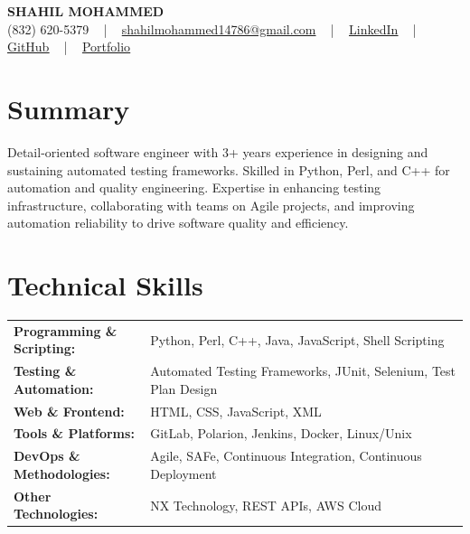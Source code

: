 \documentclass[letterpaper,11pt]{article}
\begin{document}
\begin{center}
    {\fontsize{14pt}{12pt}\selectfont \textbf{\MakeUppercase{Shahil Mohammed}}}\\ \vspace{2pt}
    \fontsize{10pt}{12pt}\selectfont (832) 620-5379 ~ | ~ \href{mailto:shahilmohammed14786@gmail.com}{shahilmohammed14786@gmail.com} ~ | ~  
    \href{https://www.linkedin.com/in/shahil-mohammed-9652931a1/}{\color{blue}\underline{LinkedIn}}  ~ | ~ 
    \href{https://github.com/freakbeast14}{\color{blue}\underline{GitHub}} ~ | ~ 
    \href{https://shahil-mohammed.netlify.app/}{\color{blue}\underline{Portfolio}}
    \vspace{-8pt}
\end{center}

\section{Summary}
\fontsize{9pt}{10pt}\selectfont
Detail-oriented software engineer with 3+ years experience in designing and sustaining automated testing frameworks. Skilled in Python, Perl, and C++ for automation and quality engineering. Expertise in enhancing testing infrastructure, collaborating with teams on Agile projects, and improving automation reliability to drive software quality and efficiency.
 \vspace{-5pt}
 
\section{Technical Skills}
        \vspace{-14pt}
        \begin{table}[h]
            \fontsize{9pt}{10pt}\selectfont
            \begin{tabular}{p{0.3\linewidth} p{0.7\linewidth}}
                \textbf{Programming \& Scripting:} & Python, Perl, C++, Java, JavaScript, Shell Scripting \\
                \textbf{Testing \& Automation:} & Automated Testing Frameworks, JUnit, Selenium, Test Plan Design \\
                \textbf{Web \& Frontend:} & HTML, CSS, JavaScript, XML \\
                \textbf{Tools \& Platforms:} & GitLab, Polarion, Jenkins, Docker, Linux/Unix \\
                \textbf{DevOps \& Methodologies:} & Agile, SAFe, Continuous Integration, Continuous Deployment \\
                \textbf{Other Technologies:} & NX Technology, REST APIs, AWS Cloud \\
            \end{tabular}
        \end{table}
 \vspace{-15pt}
 
\end{document}
